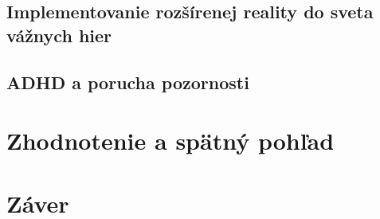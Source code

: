 \documentclass[10pt,twoside,a4paper]{article}
\begin{document}
\subsection{Implementovanie rozšírenej reality do sveta vážnych hier}

\subsection{ADHD a porucha pozornosti}




\section{Zhodnotenie a spätný pohľad} \label{konec}




\section{Záver} \label{zaver} %






\end{document}

